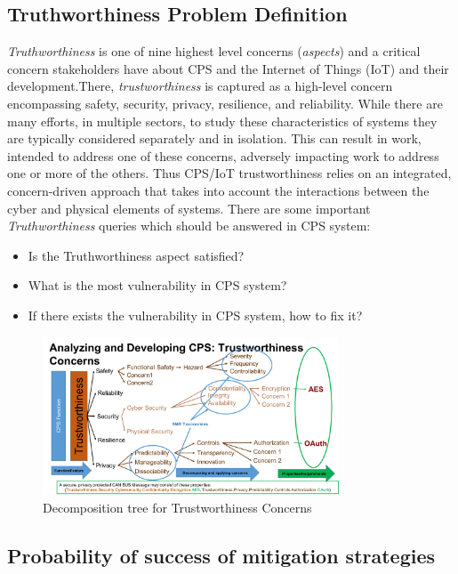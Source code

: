 \subsection{Truthworthiness Problem Definition}
\emph{Truthworthiness} is one of nine highest level concerns (\emph{aspects}) and a critical concern stakeholders have about CPS and the Internet of Things (IoT) and their development.There, \emph{trustworthiness} is captured as a high-level concern encompassing safety, security, privacy, resilience, and reliability. While there are many efforts, in multiple sectors, to study these characteristics of systems they are typically considered separately and in isolation. This can result in work, intended to address one of these concerns, adversely impacting work to address one or more of the others. Thus CPS/IoT trustworthiness relies on an integrated, concern-driven approach that takes into account the interactions between the cyber and physical elements of systems. There are some important \emph{Truthworthiness} queries which should be answered in CPS system: 
\begin{itemize}
	\item Is the Truthworthiness aspect satisfied? 
	\item What is the most vulnerability in CPS system?
	\item If there exists the vulnerability in CPS system, how to fix it?
\end{itemize}
\begin{figure}
	\includegraphics[width=250pt]{trustconcerntree.png}
	\caption{Decomposition tree for Trustworthiness Concerns\label{fig:trustworthiness}}
\end{figure}

\subsection{Probability of success of mitigation strategies}
\begin{definition}
	\label{def:probability_of_success} 
	
\end{definition}

